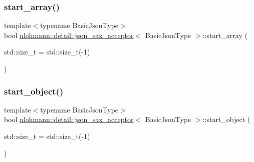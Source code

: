 \subsubsection{\texorpdfstring{start\+\_\+array()}{start\_array()}}
{\footnotesize\ttfamily template$<$typename Basic\+Json\+Type$>$ \\
bool \hyperlink{classnlohmann_1_1detail_1_1json__sax__acceptor}{nlohmann\+::detail\+::json\+\_\+sax\+\_\+acceptor}$<$ Basic\+Json\+Type $>$\+::start\+\_\+array (\begin{DoxyParamCaption}\item[{std\+::size\+\_\+t}]{ = {\ttfamily std\+:\+:size\+\_\+t(-\/1)} }\end{DoxyParamCaption})\hspace{0.3cm}{\ttfamily [inline]}}

\mbox{\label{classnlohmann_1_1detail_1_1json__sax__acceptor_a822bbca11a9fea0aa337018e351755f5}} 
\subsubsection{\texorpdfstring{start\+\_\+object()}{start\_object()}}
{\footnotesize\ttfamily template$<$typename Basic\+Json\+Type$>$ \\
bool \hyperlink{classnlohmann_1_1detail_1_1json__sax__acceptor}{nlohmann\+::detail\+::json\+\_\+sax\+\_\+acceptor}$<$ Basic\+Json\+Type $>$\+::start\+\_\+object (\begin{DoxyParamCaption}\item[{std\+::size\+\_\+t}]{ = {\ttfamily std\+:\+:size\+\_\+t(-\/1)} }\end{DoxyParamCaption})\hspace{0.3cm}{\ttfamily [inline]}}

\mbox{\label{classnlohmann_1_1detail_1_1json__sax__acceptor_aaa69255e757a6ecc4403a2aa4931fc60}} 

